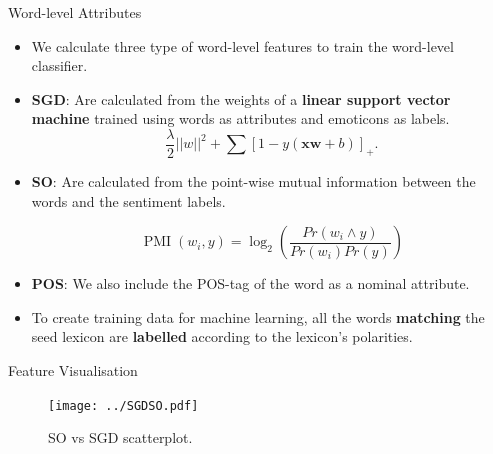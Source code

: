 \documentclass[handout]{beamer}
\begin{document}
\begin{frame}{Word-level Attributes}
\begin{scriptsize}
\begin{itemize}
\item We calculate three type of word-level features to train the word-level classifier.

\item \textbf{SGD}: Are calculated from the weights of a \textbf{linear support vector machine} trained using words as attributes and emoticons as labels.
\begin{equation}\label{eq:sgd}
\frac{\lambda}{2}||w||^2+\sum [1- y (\mathbf{xw} +b) ]_{+}.
\end{equation}

\item \textbf{SO}: Are calculated from the point-wise mutual information between the words and the sentiment labels.

\begin{equation}
 \operatorname{PMI}(w_{i}, y)= \log_{2} \left ( \frac{Pr(w_{i} \wedge y)}{Pr(w_{i})Pr(y)} \right )
\end{equation}

\item \textbf{POS}: We also include the POS-tag of the word as a nominal attribute.

\item To create training data for machine learning, all the words \textbf{matching} the seed lexicon are \textbf{labelled} according to the lexicon's polarities.
\end{itemize}
\end{scriptsize}
\end{frame}




\begin{frame}{Feature Visualisation}
\begin{scriptsize}
\begin{figure}[htb]
	\centering
	 \texttt{[image: ../SGDSO.pdf]}
	\caption{SO vs SGD scatterplot.}
	\label{fig:sosgd}
\end{figure}
\end{scriptsize}

\end{frame}
\end{document}

